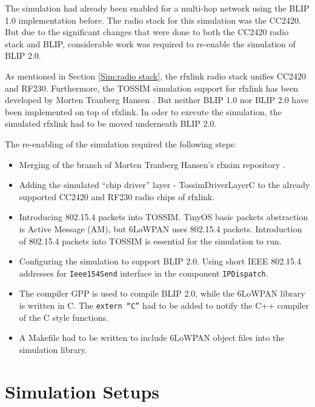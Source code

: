 The simulation had already been enabled for a multi-hop network using the BLIP 1.0 implementation before. The radio stack for this simulation was the CC2420. But due to the significant changes that were done to both the CC2420 radio stack and BLIP, considerable work was required to re-enable the simulation of BLIP 2.0. 

As mentioned in Section \ref{Sim:radio stack}, the rfxlink radio stack unifies CC2420 and RF230. Furthermore, the TOSSIM simulation support for rfxlink has been developed by Morten Tranberg Hansen \cite{rfxsim}. But neither BLIP 1.0 nor BLIP 2.0 have been implemented on top of rfxlink. In oder to execute the simulation, the simulated rfxlink had to be moved underneath BLIP 2.0. 

The re-enabling of the simulation required the following steps: 
\begin{itemize}
\item Merging of the branch of Morten Tranberg Hansen's rfxsim repository \cite{rfxsim}. 

\item Adding the simulated ``chip driver'' layer - TossimDriverLayerC to the already supported CC2420 and RF230 radio chips of rfxlink. 

\item Introducing 802.15.4 packets into TOSSIM. TinyOS basic packets abstraction is Active Message (AM), but 6LoWPAN uses 802.15.4 packets. Introduction of 802.15.4 packets into TOSSIM is essential for the simulation to run.

\item Configuring the simulation to support BLIP 2.0. Using short IEEE 802.15.4 addresses for \texttt{Ieee154Send} interface in the component \texttt{IPDispatch}. 

\item The compiler GPP is used to compile BLIP 2.0, while the 6LoWPAN library is written in C. The \texttt{extern ``C''} had to be added to notify the C++ compiler of the C style functions.

\item A Makefile had to be written to include 6LoWPAN object files into the simulation library.
\end{itemize}

\section{Simulation Setups}
\label{Sim:Setup}
